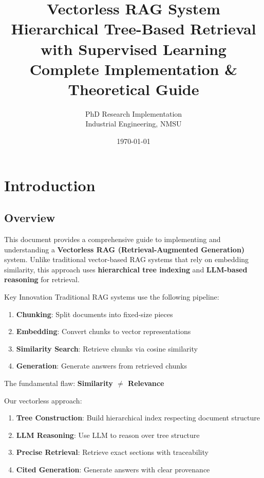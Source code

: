\documentclass[12pt,a4paper]{article}
\title{
    \huge\textbf{Vectorless RAG System} \\
    \Large Hierarchical Tree-Based Retrieval with Supervised Learning \\
    \large Complete Implementation \& Theoretical Guide
}
\author{
    PhD Research Implementation \\
    Industrial Engineering, NMSU
}
\date{\today}
\begin{document}
\maketitle
\tableofcontents
\newpage

\section{Introduction}

\subsection{Overview}

This document provides a comprehensive guide to implementing and understanding a \textbf{Vectorless RAG (Retrieval-Augmented Generation)} system. Unlike traditional vector-based RAG systems that rely on embedding similarity, this approach uses \textbf{hierarchical tree indexing} and \textbf{LLM-based reasoning} for retrieval.

\begin{conceptbox}{Key Innovation}
Traditional RAG systems use the following pipeline:
\begin{enumerate}
    \item \textbf{Chunking}: Split documents into fixed-size pieces
    \item \textbf{Embedding}: Convert chunks to vector representations
    \item \textbf{Similarity Search}: Retrieve chunks via cosine similarity
    \item \textbf{Generation}: Generate answers from retrieved chunks
\end{enumerate}

The fundamental flaw: \textbf{Similarity $\neq$ Relevance}

Our vectorless approach:
\begin{enumerate}
    \item \textbf{Tree Construction}: Build hierarchical index respecting document structure
    \item \textbf{LLM Reasoning}: Use LLM to reason over tree structure
    \item \textbf{Precise Retrieval}: Retrieve exact sections with traceability
    \item \textbf{Cited Generation}: Generate answers with clear provenance
\end{enumerate}
\end{conceptbox}
\end{document}

